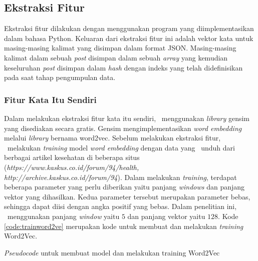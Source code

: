 \subsection{Ekstraksi Fitur}
Ekstraksi fitur dilakukan dengan menggunakan program yang diimplementasikan dalam bahasa Python. Keluaran dari ekstraksi fitur ini adalah vektor kata untuk masing-masing kalimat yang disimpan dalam format JSON. Masing-masing kalimat dalam sebuah \textit{post} disimpan dalam sebuah \textit{array} yang kemudian keseluruhan \textit{post} disimpan dalam \textit{hash} dengan indeks yang telah didefinisikan pada saat tahap pengumpulan data.

\subsubsection{Fitur Kata Itu Sendiri}
Dalam melakukan ekstraksi fitur kata itu sendiri, \saya~menggunakan \textit{library} gensim \citep{rehurek_lrec} yang disediakan secara gratis. Gensim mengimplementasikan \textit{word embedding} melalui \textit{library} bernama word2vec. Sebelum melakukan ekstraksi fitur, \saya~melakukan \textit{training} model \textit{word embedding} dengan data yang \saya~unduh dari berbagai artikel kesehatan di beberapa situs (\textit{https://www.kaskus.co.id/forum/94/health, http://archive.kaskus.co.id/forum/94}). Dalam melakukan \textit{training}, terdapat beberapa parameter yang perlu diberikan yaitu panjang \textit{windows} dan panjang vektor yang dihasilkan. Kedua parameter tersebut merupakan parameter bebas, sehingga dapat diisi dengan angka positif yang bebas. Dalam penelitian ini, \saya~menggunakan panjang \textit{window} yaitu $ 5 $ dan panjang vektor yaitu $ 128 $. Kode \ref{code:trainword2ve} merupakan kode untuk membuat dan melakukan \textit{training} Word2Vec.
\begin{kode}
	
	
	\caption{\textit{Pseudocode} untuk membuat model dan melakukan training Word2Vec}
	\label{code:trainword2ve}
\end{kode}

